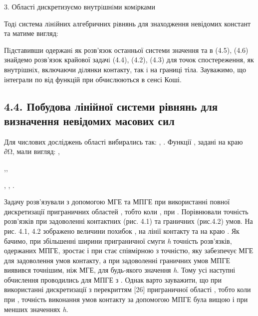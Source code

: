 3. Області дискретизуємо внутрiшнiми комiрками

Тодi система лiнiйних алгебричних рiвнянь для знаходження невідо­мих
констант та матиме вигляд:

Пiдставивши одержанi як розв'язок останньої системи значення та в (4.5),
(4.6) знайдемо розв'язок крайової задачi (4.4), (4.2), (4.3) для точок
спостереження, як внутрiшнiх, включаючи дiлянки контакту, так i на
границі тіла. Зауважимо, що інтеграли по від функцій при обчислюються в
сенсі Коші.

\hypertarget{ux43fux43eux431ux443ux434ux43eux432ux430-ux43bux456ux43dux456ux439ux43dux43eux457-ux441ux438ux441ux442ux435ux43cux438-ux440ux456ux432ux43dux44fux43dux44c-ux434ux43bux44f-ux432ux438ux437ux43dux430ux447ux435ux43dux43dux44f-ux43dux435ux432ux456ux434ux43eux43cux438ux445-ux43cux430ux441ux43eux432ux438ux445-ux441ux438ux43b-1}{%
\subsection{4.4. Побудова лінійної системи рівнянь для визначення
невідомих масових
сил}\label{ux43fux43eux431ux443ux434ux43eux432ux430-ux43bux456ux43dux456ux439ux43dux43eux457-ux441ux438ux441ux442ux435ux43cux438-ux440ux456ux432ux43dux44fux43dux44c-ux434ux43bux44f-ux432ux438ux437ux43dux430ux447ux435ux43dux43dux44f-ux43dux435ux432ux456ux434ux43eux43cux438ux445-ux43cux430ux441ux43eux432ux438ux445-ux441ux438ux43b-1}}

Для числових досліджень області вибирались так: , . Функції , задані на
краю ∂Ω, мали вигляд: ,

,,

, , .

Задачу розв'язували з допомогою МГЕ та МПГЕ при використанні повної
дискретизації приграничних областей , тобто коли , при . Порівню­вали
точність розв'язків при задоволенні контактних (рис. 4.1) та граничних
(рис.4.2) умов. На рис. 4.1, 4.2 зображено величини похибок , на лінії
контакту та на краю . Як бачимо, при збільшенні ширини приграничної
смуги \emph{h} точність розв'язків, одержаних МПГЕ, зростає і при стає
співмірною з точністю, яку забезпечує МГЕ для задоволення умов контакту,
а при задоволенні граничних умов МПГЕ виявився точнішим, ніж МГЕ, для
будь-якого значення \emph{h}. Тому усі наступні обчислення проводились
для МПГЕ з . Однак варто зауважити, що при використанні дискретизації з
перекриттям {[}26{]} приграничної області , тобто коли при , точність
виконання умов контакту за допомогою МПГЕ була вищою і при менших
значеннях \emph{h}.

